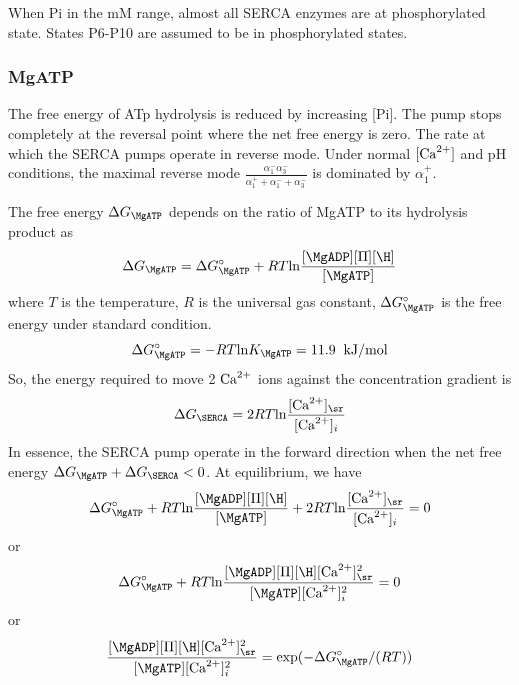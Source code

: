 When Pi in the mM range, almost all SERCA enzymes are at phosphorylated state.
States P6-P10 are assumed to be in phosphorylated states.

\subsubsection{MgATP}

The free energy of ATp hydrolysis is reduced by increasing [Pi]. The pump stops
completely at the reversal point where the net free energy is zero. The rate at
which the SERCA pumps operate in reverse mode. Under normal $[{\text{Ca}^{2+}}]$ and pH
conditions, the maximal reverse mode $\frac{\alpha_1^- \alpha_3^-}{\alpha^+_1
+ \alpha_1^-+\alpha_3^-}$ is dominated by $\alpha^+_1$.


The free energy $\Delta G_\MgATP$ depends on the ratio of MgATP to its
hydrolysis product as
\begin{equation}
  \label{eq:1274}
  \Delta G_\MgATP = \Delta G_\MgATP^\circ + RT\ln \frac{[\MgADP][\Pi][\H]}{[\MgATP]}
\end{equation}
where $T$ is the temperature, $R$ is the universal gas constant,
$\Delta G^\circ_\MgATP$ is the free energy under standard condition. 
\begin{equation}
  \label{eq:1275}
  \Delta G^\circ_\MgATP = -RT\ln K_\MgATP = 11.9\;\; \text{kJ/mol}
\end{equation}
So, the energy required to move 2 ${\text{Ca}^{2+}}$ ions against the concentration
gradient is
\begin{equation}
  \label{eq:1276}
  \Delta G_\SERCA = 2RT\ln \frac{[\Ca]_\sr}{[\Ca]_i}
\end{equation}
In essence, the SERCA pump operate in the forward direction when the
net free energy $\Delta G_\MgATP + \Delta G_\SERCA < 0$. At
equilibrium, we have
\begin{equation}
  \label{eq:1280}
  \Delta G_\MgATP^\circ + RT\ln \frac{[\MgADP][\Pi][\H]}{[\MgATP]} +
  2RT\ln \frac{[\Ca]_\sr}{[\Ca]_i} = 0
\end{equation}
or
\begin{equation}
  \label{eq:1281}
  \Delta G_\MgATP^\circ + RT\ln
  \frac{[\MgADP][\Pi][\H][\Ca]^2_\sr}{[\MgATP][\Ca]_i^2}  = 0
\end{equation}
or
\begin{equation}
  \label{eq:1282}
  \frac{[\MgADP][\Pi][\H][\Ca]^2_\sr}{[\MgATP][\Ca]_i^2}  = \exp(-  \Delta G_\MgATP^\circ/(RT))
\end{equation}

